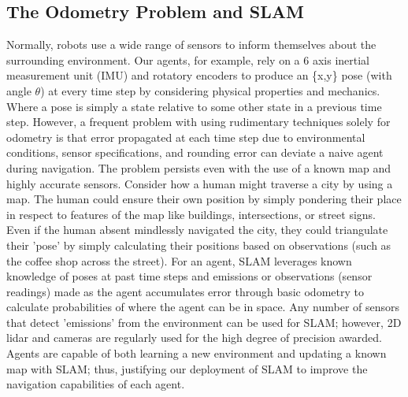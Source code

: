 \documentclass[conference]{IEEEtran}
\begin{document}
\subsection{The Odometry Problem and SLAM}Normally, robots use a wide range of sensors to inform themselves about the surrounding environment. Our agents, for example, rely on a 6 axis inertial measurement unit (IMU) and rotatory encoders to produce an \{x,y\} pose (with angle $\theta$) at every time step by considering physical properties and mechanics. Where a pose is simply a state relative to some other state in a previous time step. However, a frequent problem with using rudimentary techniques solely for odometry is that error propagated at each time step due to environmental conditions, sensor specifications, and rounding error can deviate a naive agent during navigation. The problem persists even with the use of a known map and highly accurate sensors. Consider how a human might traverse a city by using a map. The human could ensure their own position by simply pondering their place in respect to features of the map like buildings, intersections, or street signs. Even if the human absent mindlessly navigated the city, they could triangulate their 'pose' by simply calculating their positions based on observations (such as the coffee shop across the street). For an agent, SLAM leverages known knowledge of poses at past time steps and emissions or observations (sensor readings) made as the agent accumulates error through basic odometry to calculate probabilities of where the agent can be in space. Any number of sensors that detect 'emissions' from the environment can be used for SLAM; however, 2D lidar and cameras are regularly used for the high degree of precision awarded. Agents are capable of both learning a new environment and updating a known map with SLAM; thus, justifying our deployment of SLAM to improve the navigation capabilities of each agent.
\end{document}
